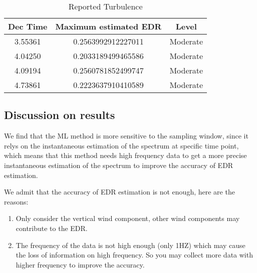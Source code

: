 \documentclass[runningheads]{llncs}
\begin{document}
\begin{table}
    \centering
    \caption{Reported Turbulence}
    \label{tab:1}
    \begin{tabularx}{\textwidth}{|C|C|C|}
        \hline
        Dec Time & Maximum estimated EDR & Level \\
        \hline
        3.55361 & 0.2563992912227011 & Moderate \\
        4.04250 & 0.2033189499465586 & Moderate \\
        4.09194 & 0.2560781852499747 & Moderate \\
        4.73861 & 0.2223637910410589 & Moderate \\
        \hline
    \end{tabularx} 
\end{table}



\subsection{Discussion on results}

We find that the ML method is more sensitive to the sampling window, since it relys on the instantaneous estimation of the spectrum at specific time point, 
which means that this method needs high frequency data to get a more precise instantaneous estimation of the spectrum to improve the accuracy of EDR estimation.

We admit that the accuracy of EDR estimation is not enough, here are the reasons:

\begin{enumerate}
    \item Only consider the vertical wind component, other wind components may contribute to the EDR.
    \item The frequency of the data is not high enough (only 1HZ) which may cause the loss of information on high frequency. So you may collect more data with higher frequency to improve the accuracy.
\end{enumerate}
\end{document}
